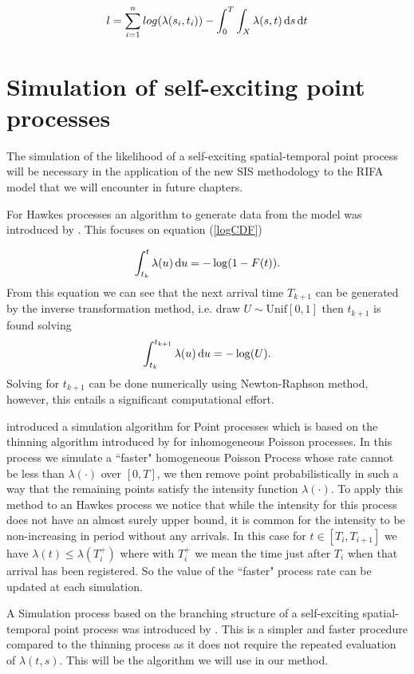 \begin{equation*}
    l = \sum_{i=1}^n log(\lambda(s_i, t_i)) - \int_0^T\int_X \lambda(s,t) \operatorname{d}\!{s} \operatorname{d}\!{t}
\end{equation*}

\section{Simulation of self-exciting point processes}

The simulation of the likelihood of a self-exciting spatial-temporal point process will be necessary in the application of the new SIS methodology to the RIFA model that we will encounter in future chapters.

For Hawkes processes an algorithm to generate data from the model was introduced by \cite{Ozaki}. This focuses on equation (\ref{logCDF})

\begin{equation*}
    \int_{t_k}^t \lambda (u) \operatorname{d}\!{u} = - \log(1 - F(t)).
\end{equation*}
From this equation we can see that the next arrival time $T_{k+1}$ can be generated by the inverse transformation method, i.e. draw $U \sim \text{Unif}[0, 1]$ then $t_{k+1}$ is found solving 
\begin{equation*}
    \int_{t_k}^{t_{k+1}} \lambda(u) \operatorname{d}\!{u} = - \log (U).
\end{equation*}
Solving for $t_{k+1}$ can be done numerically using Newton-Raphson method, however, this entails a significant computational effort.

\cite{Ogata81} introduced a simulation algorithm for Point processes which is based on the thinning algorithm introduced by \cite{Lewis} for inhomogeneous Poisson processes. In this process we simulate a ``faster" homogeneous Poisson Process whose rate cannot be less than $\lambda(\cdot)$ over $[0,T]$,  we then remove point probabilistically in such a way that the remaining points satisfy the intensity function $\lambda(\cdot)$.
To apply this method to an Hawkes process we notice that while the intensity for this process does not have an almost surely upper bound, it is common for the intensity to be non-increasing in period without any arrivals. In this case for $t \in [T_i, T_{i+1}]$ we have $\lambda(t) \leq \lambda (T^+_i)$ where with $T^+_i$ we mean the time just after $T_i$ when that arrival has been registered. So the value of the ``faster" process rate can be updated at each simulation.

A Simulation process based on the branching structure of a self-exciting spatial-temporal point process was introduced by \cite{Zhuang}. This is a simpler and faster procedure compared to the thinning process as it does not require the repeated evaluation of $\lambda(t, s)$. This will be the algorithm we will use in our method.


